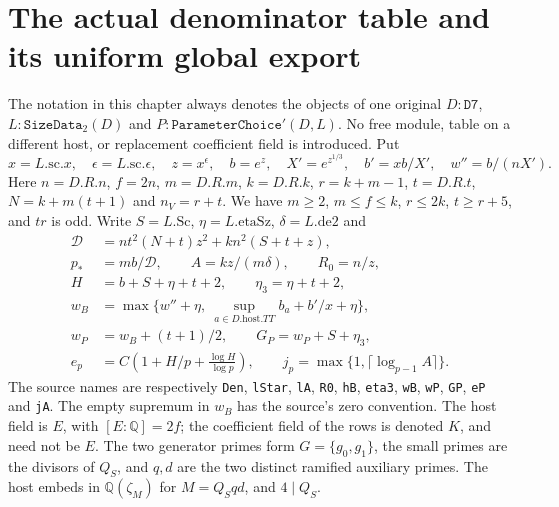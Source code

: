 \section{The actual denominator table and its uniform global export}
\label{sec:denominator-export-v050}


The notation in this chapter always denotes the objects of one original
$D:\texttt{D7}$, $L:\texttt{SizeData}_2(D)$ and
$P:\texttt{ParameterChoice}'(D,L)$.  No free module, table on a different
host, or replacement coefficient field is introduced.  Put
\[
 x=L.\mathrm{sc}.x,\quad \epsilon=L.\mathrm{sc}.\epsilon,
 \quad z=x^\epsilon,\quad b=e^z,\quad X'=e^{z^{1/3}},
 \quad b'=xb/X',\quad w''=b/(nX').                         \tag{DNE.1}
\]
Here $n=D.R.n$, $f=2n$, $m=D.R.m$, $k=D.R.k$,
$r=k+m-1$, $t=D.R.t$, $N=k+m(t+1)$ and $n_V=r+t$.
We have $m\ge2$, $m\le f\le k$, $r\le2k$, $t\ge r+5$,
and $tr$ is odd.  Write $S=L.\mathrm{Sc}$, $\eta=L.\mathrm{etaSz}$,
$\delta=L.\mathrm{de2}$ and
\[
\begin{split}
 \mathcal D&=nt^2(N+t)z^2+kn^2(S+t+z),\\
 p_*&=mb/\mathcal D,\qquad A=kz/(m\delta),\qquad R_0=n/z,\\
 H&=b+S+\eta+t+2,\qquad \eta_3=\eta+t+2,\\
 w_B&=\max\{w''+\eta,\ \sup_{a\in D.\mathrm{host}.TT}b_a+b'/x+\eta\},\\
 w_P&=w_B+(t+1)/2,\qquad G_P=w_P+S+\eta_3,\\
 e_p&=C\left(1+H/p+\frac{\log H}{\log p}\right),\qquad
 j_p=\max\{1,\lceil\log_{p-1}A\rceil\}.
\end{split}                                                       \tag{DNE.2}
\]
The source names are respectively \texttt{Den}, \texttt{lStar},
\texttt{lA}, \texttt{R0}, \texttt{hB}, \texttt{eta3},
\texttt{wB}, \texttt{wP}, \texttt{GP}, \texttt{eP} and \texttt{jA}.
The empty supremum in $w_B$ has the source's zero convention.
The host field is $E$, with $[E:\mathbb Q]=2f$; the coefficient
field of the rows is denoted $K$, and need not be $E$.
The two generator primes form $G=\{g_0,g_1\}$, the small primes
are the divisors of $Q_S$, and $q,d$ are the two distinct ramified
auxiliary primes.  The host embeds in
$\mathbb Q(\zeta_M)$ for $M=Q_Sqd$, and $4\mid Q_S$.


